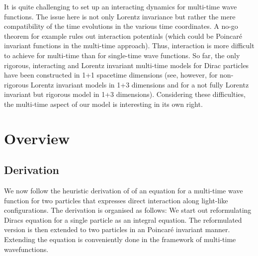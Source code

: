 \documentclass[b5paper,draft,openbib,12pt]{memoir}
\begin{document}
It is quite challenging to set up an interacting dynamics 
  for multi-time wave functions. The issue here is not only Lorentz 
  invariance but rather the mere compatibility of the time 
  evolutions in the various time coordinates. A no-go theorem 
  \cite{nogo_potentials,deckert_nickel_2016} for example rules 
  out interaction potentials (which could be Poincar\'{e} 
  invariant functions in the multi-time approach). Thus, 
  interaction is more difficult to achieve for multi-time than for 
  single-time wave functions. So far, the only rigorous, 
  interacting and Lorentz invariant multi-time models for Dirac 
  particles have been constructed in 1+1 spacetime dimensions 
  \cite{1d_model,nt_model} (see, however, \cite{drozvincent_1981,
  sazdjian_2bd,2bdem} for non-rigorous Lorentz invariant models 
  in 1+3 dimensions and \cite[chap.\ 3]{phd_nickel} for a not 
  fully Lorentz invariant but rigorous model in 1+3 dimensions). 
  Considering these difficulties, the multi-time aspect of our 
  model is interesting in its own right.


\section{Overview}
\subsection{Derivation}

We now follow the heuristic derivation of \cite{direct_interaction_quantum} 
of an equation for a multi-time wave function for two particles  
that expresses direct interaction along light-like configurations. 
The derivation is organised as follows: We start out 
reformulating Diracs equation
for a single particle 
as an integral equation. The reformulated version is then 
extended to  two particles
in an Poincaré invariant manner. Extending the 
equation is conveniently done in 
the framework of multi-time wavefunctions.
\end{document}
